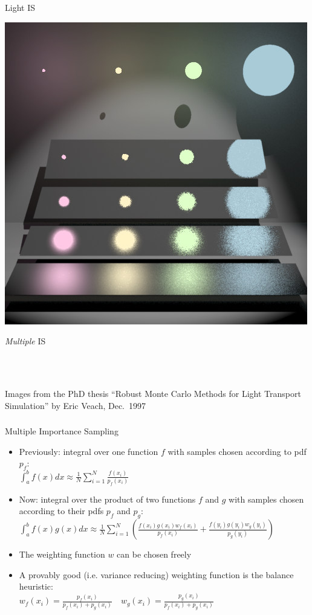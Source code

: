 \documentclass[utf8,stillsansserifmath,fleqn,t]{beamer}
\newcommand{\ds}{\displaystyle}
\begin{document}
\begin{frame}
\begin{minipage}[t]{.33\textwidth}
\centerline{Light IS}
\end{minipage}\hfill
\begin{minipage}[t]{.33\textwidth}
\includegraphics[width=\textwidth]{./fig/veach-mis-3.png}
\centerline{\emph{Multiple} IS}
\end{minipage}\\~\\
\centerline{\tiny Images from the PhD thesis ``Robust Monte Carlo Methods for Light Transport Simulation'' by Eric Veach, Dec.~1997}
\end{frame}

\begin{frame}
\frametitle{\insertsection}
Multiple Importance Sampling
\begin{itemize}
\item Previously: integral over one function $f$ with samples
chosen according to pdf $p_f$:\\
$\ds \int_a^b f(x)dx \approx \frac{1}{N} \sum_{i=1}^{N} \frac{f(x_i)}{p_f(x_i)}$
\item Now: integral over the product of two functions $f$ and $g$ with
samples chosen according to their pdfs $p_f$ and $p_g$:\\
$\ds \int_a^b f(x)g(x)dx \approx \frac{1}{N} \sum_{i=1}^{N} \left(\frac{f(x_i)g(x_i)w_f(x_i)}{p_f(x_i)}
+\frac{f(y_i)g(y_i)w_g(y_i)}{p_g(y_i)}\right)$
\item The weighting function $w$ can be chosen freely
\item A provably good (i.e. variance reducing) weighting function is the balance heuristic:\\
$\ds w_f(x_i)=\frac{p_f(x_i)}{p_f(x_i)+p_g(x_i)} \quad w_g(x_i)=\frac{p_g(x_i)}{p_f(x_i)+p_g(x_i)}$\\
\end{itemize}
\end{frame}
\end{document}
